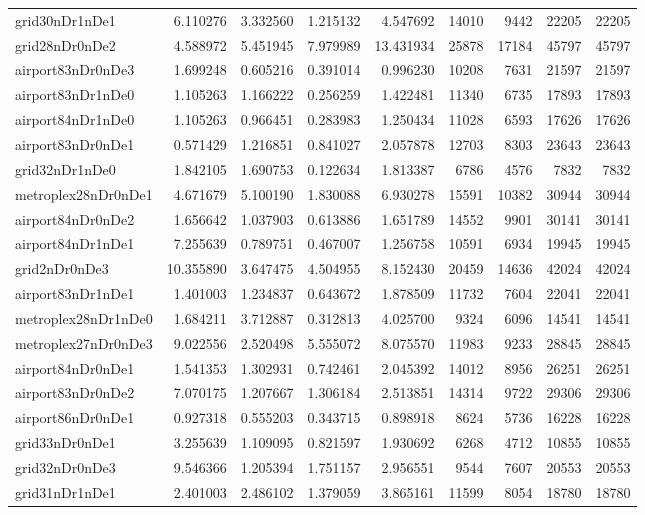 \begin{longtable}{|l|r|r|r|r|r|r|r|r|}
grid30nDr1nDe1 & 6.110276 & 3.332560 & 1.215132 & 4.547692 & 14010 & 9442 & 22205 & 22205 \\
grid28nDr0nDe2 & 4.588972 & 5.451945 & 7.979989 & 13.431934 & 25878 & 17184 & 45797 & 45797 \\
airport83nDr0nDe3 & 1.699248 & 0.605216 & 0.391014 & 0.996230 & 10208 & 7631 & 21597 & 21597 \\
airport83nDr1nDe0 & 1.105263 & 1.166222 & 0.256259 & 1.422481 & 11340 & 6735 & 17893 & 17893 \\
airport84nDr1nDe0 & 1.105263 & 0.966451 & 0.283983 & 1.250434 & 11028 & 6593 & 17626 & 17626 \\
airport83nDr0nDe1 & 0.571429 & 1.216851 & 0.841027 & 2.057878 & 12703 & 8303 & 23643 & 23643 \\
grid32nDr1nDe0 & 1.842105 & 1.690753 & 0.122634 & 1.813387 & 6786 & 4576 & 7832 & 7832 \\
metroplex28nDr0nDe1 & 4.671679 & 5.100190 & 1.830088 & 6.930278 & 15591 & 10382 & 30944 & 30944 \\
airport84nDr0nDe2 & 1.656642 & 1.037903 & 0.613886 & 1.651789 & 14552 & 9901 & 30141 & 30141 \\
airport84nDr1nDe1 & 7.255639 & 0.789751 & 0.467007 & 1.256758 & 10591 & 6934 & 19945 & 19945 \\
grid2nDr0nDe3 & 10.355890 & 3.647475 & 4.504955 & 8.152430 & 20459 & 14636 & 42024 & 42024 \\
airport83nDr1nDe1 & 1.401003 & 1.234837 & 0.643672 & 1.878509 & 11732 & 7604 & 22041 & 22041 \\
metroplex28nDr1nDe0 & 1.684211 & 3.712887 & 0.312813 & 4.025700 & 9324 & 6096 & 14541 & 14541 \\
metroplex27nDr0nDe3 & 9.022556 & 2.520498 & 5.555072 & 8.075570 & 11983 & 9233 & 28845 & 28845 \\
airport84nDr0nDe1 & 1.541353 & 1.302931 & 0.742461 & 2.045392 & 14012 & 8956 & 26251 & 26251 \\
airport83nDr0nDe2 & 7.070175 & 1.207667 & 1.306184 & 2.513851 & 14314 & 9722 & 29306 & 29306 \\
airport86nDr0nDe1 & 0.927318 & 0.555203 & 0.343715 & 0.898918 & 8624 & 5736 & 16228 & 16228 \\
grid33nDr0nDe1 & 3.255639 & 1.109095 & 0.821597 & 1.930692 & 6268 & 4712 & 10855 & 10855 \\
grid32nDr0nDe3 & 9.546366 & 1.205394 & 1.751157 & 2.956551 & 9544 & 7607 & 20553 & 20553 \\
grid31nDr1nDe1 & 2.401003 & 2.486102 & 1.379059 & 3.865161 & 11599 & 8054 & 18780 & 18780 \\

\end{longtable}
